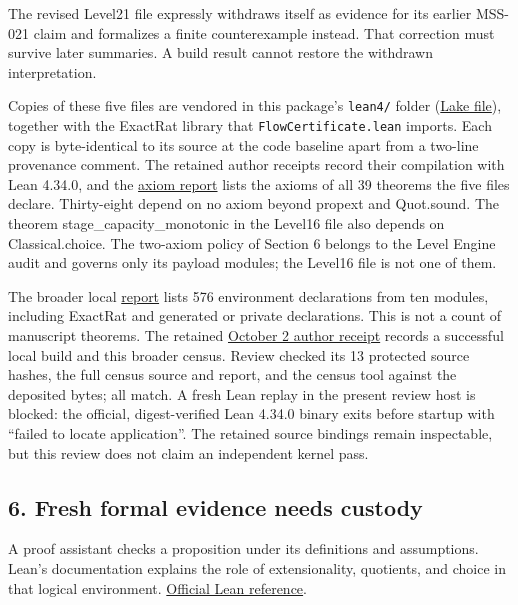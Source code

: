 \documentclass[
  11pt,
]{article}
\newcommand{\passthrough}[1]{#1}
\begin{document}
The revised Level21 file expressly withdraws itself as evidence for its
earlier MSS-021 claim and formalizes a finite counterexample instead.
That correction must survive later summaries. A build result cannot
restore the withdrawn interpretation.

Copies of these five files are vendored in this package's
\passthrough{\lstinline!lean4/!} folder
(\href{../../008_pfp_mssn_tower_challenges_and_retraction_benchmarks/lean4/lakefile.lean}{Lake
file}), together with the ExactRat library that
\mbox{\nolinkurl{FlowCertificate.lean}} imports. Each copy is
byte-identical to its source at the code baseline apart from a two-line
provenance comment. The retained author receipts record their
compilation with Lean 4.34.0, and the
\href{../../008_pfp_mssn_tower_challenges_and_retraction_benchmarks/lean4/axiom_report.txt}{axiom
report} lists the axioms of all 39 theorems the five files declare.
Thirty-eight depend on no axiom beyond propext and Quot.sound. The
theorem stage\_capacity\_monotonic in the Level16 file also depends on
Classical.choice. The two-axiom policy of Section 6 belongs to the Level
Engine audit and governs only its payload modules; the Level16 file is
not one of them.

The broader local
\href{../../008_pfp_mssn_tower_challenges_and_retraction_benchmarks/lean4/full_axiom_report.txt}{report}
lists 576 environment declarations from ten modules, including ExactRat
and generated or private declarations. This is not a count of manuscript
theorems. The retained
\href{../../008_pfp_mssn_tower_challenges_and_retraction_benchmarks/docs/release_validation_2026_10_02.json}{October
2 author receipt} records a successful local build and this broader
census. Review checked its 13 protected source hashes, the full census
source and report, and the census tool against the deposited bytes; all
match. A fresh Lean replay in the present review host is blocked: the
official, digest-verified Lean 4.34.0 binary exits before startup with
``failed to locate application''. The retained source bindings remain
inspectable, but this review does not claim an independent kernel pass.

\hypertarget{fresh-formal-evidence-needs-custody}{%
\subsection{6. Fresh formal evidence needs
custody}\label{fresh-formal-evidence-needs-custody}}

A proof assistant checks a proposition under its definitions and
assumptions. Lean's documentation explains the role of extensionality,
quotients, and choice in that logical environment.
\href{https://lean-lang.org/theorem_proving_in_lean4/Axioms-and-Computation/}{Official
Lean reference}.
\end{document}
